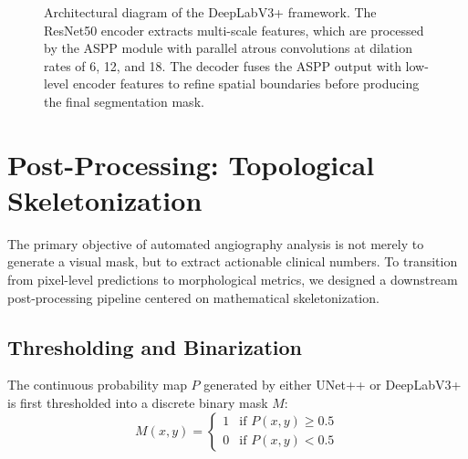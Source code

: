 \begin{figure}[H]
    \centering
    \caption{Architectural diagram of the DeepLabV3+ framework. The ResNet50 encoder extracts multi-scale features, which are processed by the ASPP module with parallel atrous convolutions at dilation rates of 6, 12, and 18. The decoder fuses the ASPP output with low-level encoder features to refine spatial boundaries before producing the final segmentation mask.}
    \label{fig:deeplabv3p_architecture}
\end{figure}

\section{Post-Processing: Topological Skeletonization}
The primary objective of automated angiography analysis is not merely to generate a visual mask, but to extract actionable clinical numbers. To transition from pixel-level predictions to morphological metrics, we designed a downstream post-processing pipeline centered on mathematical skeletonization.

\subsection{Thresholding and Binarization}
The continuous probability map $P$ generated by either UNet++ or DeepLabV3+ is first thresholded into a discrete binary mask $M$:
\begin{equation}
    M(x,y) = \begin{cases}
        1 & \text{if } P(x,y) \ge 0.5 \\
        0 & \text{if } P(x,y) < 0.5
    \end{cases}
\end{equation}

